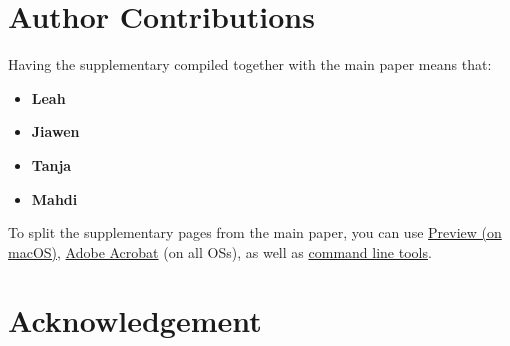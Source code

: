 \clearpage
\setcounter{page}{1}
\maketitlesupplementary


\section*{Author Contributions}
\label{sec:rationale}
Having the supplementary compiled together with the main paper means that:
% 
\begin{itemize}
\item \textbf{Leah}
\item \textbf{Jiawen}
\item \textbf{Tanja}
\item \textbf{Mahdi}
\end{itemize}
% 
To split the supplementary pages from the main paper, you can use \href{https://support.apple.com/en-ca/guide/preview/prvw11793/mac#:~:text=Delete%20a%20page%20from%20a,or%20choose%20Edit%20%3E%20Delete).}{Preview (on macOS)}, \href{https://www.adobe.com/acrobat/how-to/delete-pages-from-pdf.html#:~:text=Choose%20%E2%80%9CTools%E2%80%9D%20%3E%20%E2%80%9COrganize,or%20pages%20from%20the%20file.}{Adobe Acrobat} (on all OSs), as well as \href{https://superuser.com/questions/517986/is-it-possible-to-delete-some-pages-of-a-pdf-document}{command line tools}.

\section*{Acknowledgement}

